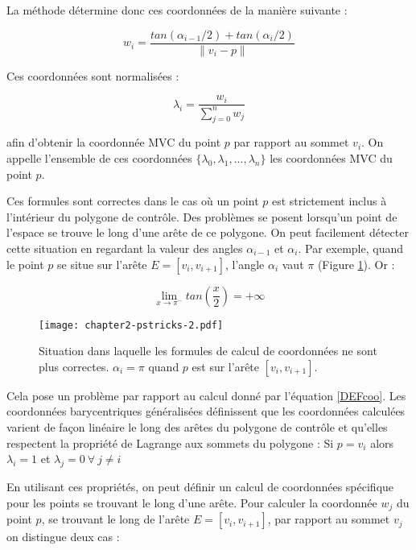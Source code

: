 La méthode détermine donc ces coordonnées de la manière suivante :

\begin{equation}
  w_i = \frac{tan(\alpha_{i-1}/2) + tan(\alpha_i/2)}{\| v_i - p \|}
  \label{DEFcoo}
\end{equation}

Ces coordonnées sont normalisées :

\begin{equation}
  \lambda_i = \frac{w_i}{\sum_{j=0}^n w_j}
\end{equation}

afin d'obtenir la coordonnée MVC du point $p$ par rapport au sommet $v_i$. On
appelle l'ensemble de ces coordonnées $\{\lambda_0, \lambda_1, ..., \lambda_n\}$
les coordonnées MVC du point $p$.

Ces formules sont correctes dans le cas où un point $p$ est strictement inclus à
l'intérieur du polygone de contrôle. Des problèmes se posent lorsqu'un point de
l'espace se trouve le long d'une arête de ce polygone. On peut facilement
détecter cette situation en regardant la valeur des angles $\alpha_{i-1}$ et
$\alpha_i$. Par exemple, quand le point $p$ se situe sur l'arête $E =
[v_i,v_{i+1}]$, l'angle $\alpha_i$ vaut $\pi$ (Figure \ref{DEFinc}). Or :

\begin{displaymath}
  \lim\limits_{x \to \pi^-} tan(\frac{x}{2}) = +\infty
\end{displaymath}

\begin{figure}[ht]
  \begin{center}
    \texttt{[image: chapter2-pstricks-2.pdf]}
    \caption{Situation dans laquelle les formules de calcul de coordonnées ne
    sont plus correctes. $\alpha_i = \pi$ quand $p$ est sur l'arête
    $[v_i,v_{i+1}]$.}
    \label{DEFinc}
  \end{center}
\end{figure}

Cela pose un problème par rapport au calcul donné par l'équation \ref{DEFcoo}.
Les coordonnées barycentriques généralisées définissent que les coordonnées
calculées varient de façon linéaire le long des arêtes du polygone de contrôle
et qu'elles respectent la propriété de Lagrange aux sommets du polygone : Si $p
= v_i$ alors $\lambda_i = 1$ et $\lambda_j = 0 ~\forall~ j \neq i$ 

En utilisant ces propriétés, on peut définir un calcul de coordonnées spécifique
pour les points se trouvant le long d'une arête. Pour calculer la coordonnée
$w_j$ du point $p$, se trouvant le long de l'arête $E = [v_i,v_{i+1}]$, par
rapport au sommet $v_j$ on distingue deux cas :

